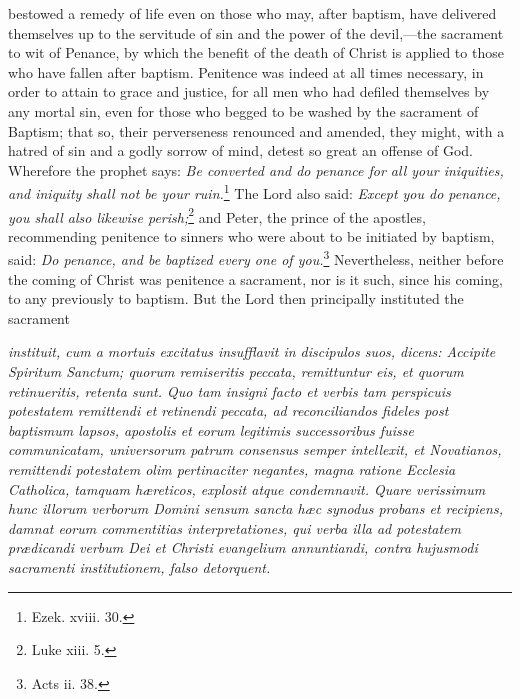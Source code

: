 bestowed a remedy of life even on those who may, after baptism, have delivered themselves up to the servitude of sin and the power of the devil,—the sacrament to wit of Penance, by which the benefit of the death of Christ is applied to those who have fallen after baptism. Penitence was indeed at all times necessary, in order to attain to grace and justice, for all men who had defiled themselves by any mortal sin, even for those who begged to be washed by the sacrament of Baptism; that so, their perverseness renounced and amended, they might, with a hatred of sin and a godly sorrow of mind, detest so great an offense of God. Wherefore the prophet says: \emph{Be converted and do penance for all your iniquities, and iniquity shall not be your ruin.}\footnote{\par   Ezek. xviii. 30.} The Lord also said: \emph{Except you do penance, you shall also likewise perish;}\footnote{\par   Luke xiii. 5.} and Peter, the prince of the apostles, recommending penitence to sinners who were about to be initiated by baptism, said: \emph{Do penance, and be baptized every one of you.}\footnote{\par   Acts ii. 38.} Nevertheless, neither before the coming of Christ was penitence a sacrament, nor is it such, since his coming, to any previously to baptism. But the Lord then principally instituted the sacrament

\emph{instituit, cum a mortuis excitatus insufflavit in discipulos suos, dicens: Accipite Spiritum Sanctum; quorum remiseritis peccata, remittuntur eis, et quorum retinueritis, retenta sunt. Quo tam insigni facto et verbis tam perspicuis potestatem remittendi et retinendi peccata, ad reconciliandos fideles post baptismum lapsos, apostolis et eorum legitimis successoribus fuisse communicatam, universorum patrum consensus semper intellexit, et Novatianos, remittendi potestatem olim pertinaciter negantes, magna ratione Ecclesia Catholica, tamquam hæreticos, explosit atque condemnavit. Quare verissimum hunc illorum verborum Domini sensum sancta hæc synodus probans et recipiens, damnat eorum commentitias interpretationes, qui verba illa ad potestatem prædicandi verbum Dei et Christi evangelium annuntiandi, contra hujusmodi sacramenti institutionem, falso detorquent.}

